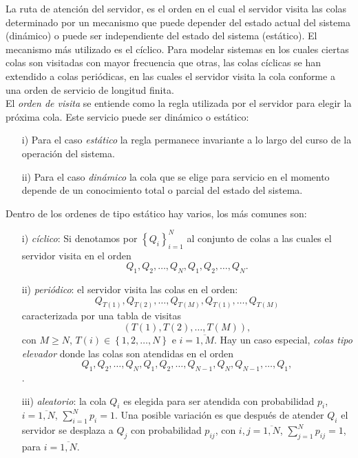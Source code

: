 \documentclass{article}
\numberwithin{equation}{section}
\begin{document}
La ruta de atenci\'on del servidor, es el orden en el cual el servidor visita las colas determinado por un mecanismo que puede depender del estado actual del sistema (din\'amico) o puede ser independiente del estado del sistema (est\'atico). El mecanismo m\'as utilizado es el c\'iclico. Para modelar sistemas en los cuales ciertas colas son visitadas con mayor frecuencia que otras, las colas c\'iclicas se han extendido a colas peri\'odicas, en las cuales el servidor visita la cola conforme a una orden de servicio de longitud finita. \\

El {\em orden de visita} se entiende como la regla utilizada por el servidor para elegir la pr\'oxima cola. Este servicio puede ser din\'amico o est\'atico:

\begin{itemize}
\item[i)] Para el caso {\em est\'atico} la regla permanece invariante a lo largo del curso de la operaci\'on del sistema.

\item[ii)] Para el caso {\em din\'amico} la cola que se elige para servicio en el momento depende de un conocimiento total o parcial del estado del sistema.
\end{itemize}

Dentro de los ordenes de tipo est\'atico hay varios, los m\'as comunes son:

\begin{itemize}
\item[i)] {\em c\'iclico}: Si denotamos por $\left\{Q_{i}\right\}_{i=1}^{N}$ al conjunto de colas a las cuales el servidor visita en el orden \[Q_{1},Q_{2},\ldots,Q_{N},Q_{1},Q_{2},\ldots,Q_{N}.\]

\item[ii)] {\em peri\'odico}: el servidor visita las colas en el orden:
\[Q_{T\left(1\right)},Q_{T\left(2\right)},\ldots,Q_{T\left(M\right)},Q_{T\left(1\right)},\ldots,Q_{T\left(M\right)}\]
caracterizada por una tabla de visitas
\[\left(T\left(1\right),T\left(2\right),\ldots,T\left(M\right)\right),\]
con $M\geq N$, $T\left(i\right)\in\left\{1,2,\ldots,N\right\}$ e $i=\overline{1,M}$. Hay un caso especial, {\em colas tipo elevador} donde las colas son atendidas en el orden \[Q_{1},Q_{2},\ldots,Q_{N},Q_{1},Q_{2},\ldots,Q_{N-1},Q_{N},Q_{N-1},\ldots,Q_{1},\].

\item[iii)] {\em aleatorio}: la cola $Q_{i}$ es elegida para ser atendida con probabilidad $p_{i}$, $i=\overline{1,N}$, $\sum_{i=1}^{N}p_{i}=1$. Una posible variaci\'on es que despu\'es de atender $Q_{i}$ el servidor se desplaza a $Q_{j}$ con probabilidad $p_{ij}$, con $i,j=\overline{1,N}$, $\sum_{j=1}^{N}p_{ij}=1$, para $i=\overline{1,N}$.
\end{itemize}
\end{document}
